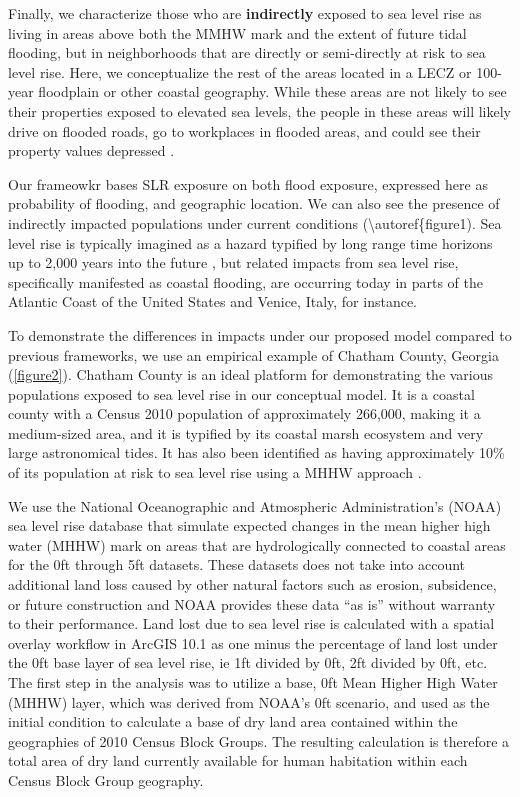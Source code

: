 \documentclass[12pt,]{article}
\begin{document}
Finally, we characterize those who are \textbf{indirectly} exposed to
sea level rise as living in areas above both the MMHW mark and the
extent of future tidal flooding, but in neighborhoods that are directly
or semi-directly at risk to sea level rise. Here, we conceptualize the
rest of the areas located in a LECZ or 100-year floodplain or other
coastal geography. While these areas are not likely to see their
properties exposed to elevated sea levels, the people in these areas
will likely drive on flooded roads, go to workplaces in flooded areas,
and could see their property values depressed \citep{neumann2015joint}.

Our frameowkr bases SLR exposure on both flood exposure, expressed here
as probability of flooding, and geographic location. We can also see the
presence of indirectly impacted populations under current conditions
(\textbackslash{}autoref\{figure1). Sea level rise is typically imagined
as a hazard typified by long range time horizons up to 2,000 years into
the future \citep{strauss2015carbon}, but related impacts from sea level
rise, specifically manifested as coastal flooding, are occurring today
in parts of the Atlantic Coast of the United States and Venice, Italy,
for instance.

To demonstrate the differences in impacts under our proposed model
compared to previous frameworks, we use an empirical example of Chatham
County, Georgia (\autoref{figure2}). Chatham County is an ideal platform
for demonstrating the various populations exposed to sea level rise in
our conceptual model. It is a coastal county with a Census 2010
population of approximately 266,000, making it a medium-sized area, and
it is typified by its coastal marsh ecosystem and very large
astronomical tides. It has also been identified as having approximately
10\% of its population at risk to sea level rise using a MHHW approach
\citep{hauer2016millions}.

We use the National Oceanographic and Atmospheric Administration's
(NOAA) sea level rise database that simulate expected changes in the
mean higher high water (MHHW) mark on areas that are hydrologically
connected to coastal areas for the 0ft through 5ft datasets. These
datasets does not take into account additional land loss caused by other
natural factors such as erosion, subsidence, or future construction and
NOAA provides these data ``as is'' without warranty to their
performance. Land lost due to sea level rise is calculated with a
spatial overlay workflow in ArcGIS 10.1 as one minus the percentage of
land lost under the 0ft base layer of sea level rise, ie 1ft divided by
0ft, 2ft divided by 0ft, etc. The first step in the analysis was to
utilize a base, 0ft Mean Higher High Water (MHHW) layer, which was
derived from NOAA's 0ft scenario, and used as the initial condition to
calculate a base of dry land area contained within the geographies of
2010 Census Block Groups. The resulting calculation is therefore a total
area of dry land currently available for human habitation within each
Census Block Group geography.
\end{document}
